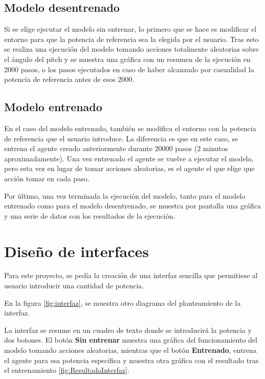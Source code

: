 \label{fig:comprobación}

\subsection{Modelo desentrenado}

Si se elige ejecutar el modelo sin entrenar, lo primero que se hace es modificar el entorno para que la potencia de referencia sea la elegida por el usuario.
Tras esto se realiza una ejecución del modelo tomando acciones totalmente aleatorias sobre el ángulo del pitch y se muestra una gráfica con un resumen de la ejecución en 2000 pasos, o los pasos ejecutados en caso de haber alcanzado por casualidad la potencia de referencia antes de esos 2000.

\subsection{Modelo entrenado}

En el caso del modelo entrenado, también se modifica el entorno con la potencia de referencia que el usuario introduce. La diferencia es que en este caso, se entrena el agente creado anteriormente durante 20000 pasos (2 minutos aproximadamente).
Una vez entrenado el agente se vuelve a ejecutar el modelo, pero esta vez en lugar de tomar acciones aleatorias, es el agente el que elige que acción tomar en cada paso.

Por último, una vez terminada la ejecución del modelo, tanto para el modelo entrenado como para el modelo desentrenado, se muestra por pantalla una gráfica y una serie de datos con los resultados de la ejecución.

\section{Diseño de interfaces}

Para este proyecto, se pedía la creación de una interfaz sencilla que permitiese al usuario introducir una cantidad de potencia.

En la figura \ref{fig:interfaz}, se muestra otro diagrama del planteamiento de la interfaz.

\label{fig:interfaz}

La interfaz se resume en un cuadro de texto donde se introducirá la potencia y dos botones. 
El botón \textbf{Sin entrenar} muestra una gráfica del funcionamiento del modelo tomando acciones aleatorias, mientras que el botón \textbf{Entrenado}, entrena el agente para esa potencia específica y muestra otra gráfica con el resultado tras el entrenamiento \ref{fig:ResultadoInterfaz}.

